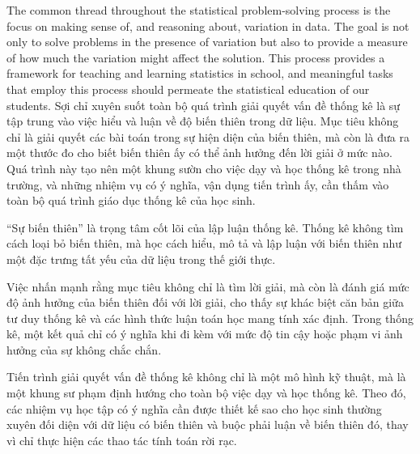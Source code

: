 \documentclass[
  10pt,
  a4paper,
  landscape,
  twoside,
  openany
]{scrbook}
\newcommand{\EN}[1]{#1}
\newcommand{\VI}[1]{#1}
\newcommand{\NOTE}[1]{#1}
\begin{document}
\TriPara
{
\EN{The common thread throughout the statistical problem-solving process is the focus on making sense of, and reasoning about, variation in data. The goal is not only to solve problems in the presence of variation but also to provide a measure of how much the variation might affect the solution. This process provides a framework for teaching and learning statistics in school, and meaningful tasks that employ this process should permeate the statistical education of our students.}
}
{
\VI{Sợi chỉ xuyên suốt toàn bộ quá trình giải quyết vấn đề thống kê là sự tập trung vào việc hiểu và luận về độ biến thiên trong dữ liệu. Mục tiêu không chỉ là giải quyết các bài toán trong sự hiện diện của biến thiên, mà còn là đưa ra một thước đo cho biết biến thiên ấy có thể ảnh hưởng đến lời giải ở mức nào. Quá trình này tạo nên một khung sườn cho việc dạy và học thống kê trong nhà trường, và những nhiệm vụ có ý nghĩa, vận dụng tiến trình ấy, cần thấm vào toàn bộ quá trình giáo dục thống kê của học sinh.}
}
{
\NOTE{``Sự biến thiên'' là trọng tâm cốt lõi của lập luận thống kê. Thống kê không tìm cách loại bỏ biến thiên, mà học cách hiểu, mô tả và lập luận với biến thiên như một đặc trưng tất yếu của dữ liệu trong thế giới thực.

Việc nhấn mạnh rằng mục tiêu không chỉ là tìm lời giải, mà còn là đánh giá mức độ ảnh hưởng của biến thiên đối với lời giải, cho thấy sự khác biệt căn bản giữa tư duy thống kê và các hình thức luận toán học mang tính xác định. Trong thống kê, một kết quả chỉ có ý nghĩa khi đi kèm với mức độ tin cậy hoặc phạm vi ảnh hưởng của sự không chắc chắn.

Tiến trình giải quyết vấn đề thống kê không chỉ là một mô hình kỹ thuật, mà là một khung sư phạm định hướng cho toàn bộ việc dạy và học thống kê. Theo đó, các nhiệm vụ học tập có ý nghĩa cần được thiết kế sao cho học sinh thường xuyên đối diện với dữ liệu có biến thiên và buộc phải luận về biến thiên đó, thay vì chỉ thực hiện các thao tác tính toán rời rạc.}
}
\end{document}
